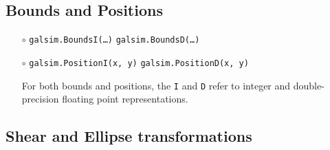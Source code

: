 \documentclass[preprint,11pt]{../../devel/modules/aastex}
\begin{document}
\subsection{Bounds and Positions}\label{sect:bounds}

\begin{itemize}

\item[$\circ$] \texttt{galsim.BoundsI(\dots)} \newline
  \texttt{galsim.BoundsD(\dots)} 

\item[$\circ$] \texttt{galsim.PositionI(x, y)} \newline
  \texttt{galsim.PositionD(x, y)} 

For both bounds and positions, the \texttt{I} and \texttt{D} refer to
integer and double-precision floating point representations.

\end{itemize}

\subsection{Shear and Ellipse transformations}\label{sect:shears}
\end{document}
